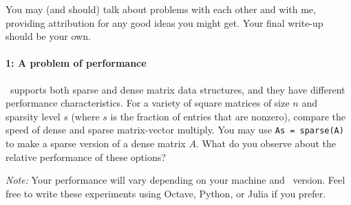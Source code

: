 \documentclass[12pt, leqno]{article} %
\begin{document}

You may (and should) talk about problems with each other and with me,
providing attribution for any good ideas you might get.  Your final
write-up should be your own.

\paragraph*{1: A problem of performance}
\matlab\ supports both sparse and dense matrix data structures,
and they have different performance characteristics.  For a variety
of square matrices of size $n$ and sparsity level $s$ (where $s$ is
the fraction of entries that are nonzero), compare the speed of dense
and sparse matrix-vector multiply.  You may use {\tt As = sparse(A)}
to make a sparse version of a dense matrix $A$.  What do you observe
about the relative performance of these options?

{\em Note:} Your performance will vary depending on your machine and
\matlab\ version.  Feel free to write these experiments using
Octave, Python, or Julia if you prefer.
\end{document}
